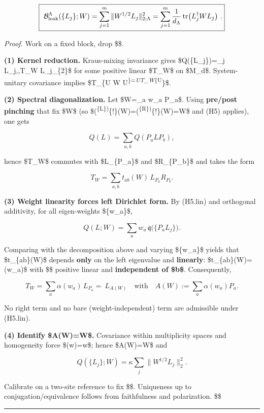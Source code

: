 \documentclass[
]{article}
\numberwithin{equation}{section}
\begin{document}
\[
\boxed{\ \mathcal B^{\Lambda}_{\rm leak}(\{L_j\};W)=\sum_{j=1}^m \|W^{1/2}L_j\|_{2;\Lambda}^2
=\sum_{j=1}^m\frac{1}{d_\Lambda}\operatorname{tr}\!\big(L_j^\dagger W L_j\big)\ .}
\]

\emph{Proof.} Work on a fixed block, drop \$\Lambda\$.

\textbf{(1) Kernel reduction.} Kraus-mixing invariance gives
\$Q(\{L\_j\})=\sum\_j \langle L\_j,,T\_W L\_j\rangle\_\{2\}\$ for some
positive linear \$T\_W\$ on \$M\_d\$. System-unitary covariance implies
\$T\_\{U W
U\textsuperscript{\dagger\}=\emph{U\circ T\_W\circ {}}\{U}\dagger\}\$.

\textbf{(2) Spectral diagonalization.} Let \$W=\sum\_a w\_a P\_a\$.
Using \textbf{pre/post pinching} that fix \$W\$ (so
\$(\Pi\textsuperscript{\{\rm L\})}\{!\}(W)=(\Pi\textsuperscript{\{\rm R\})}\{!\}(W)=W\$
and (H5) applies), one gets

\[
Q(L)=\sum_{a,b}Q(P_a L P_b),
\]

hence \$T\_W\$ commutes with \$L\_\{P\_a\}\$ and \$R\_\{P\_b\}\$ and
takes the form

\[
T_W=\sum_{a,b} t_{ab}(W)\,L_{P_a}R_{P_b}.
\]

\textbf{(3) Weight linearity forces left Dirichlet form.} By (H5.lin)
and orthogonal additivity, for all eigen-weights \$\{w\_a\}\$,

\[
Q(L;W)=\sum_a w_a\,\mathfrak q\!\big(\{P_a L_j\}\big).
\]

Comparing with the decomposition above and varying \$\{w\_a\}\$ yields
that \$t\_\{ab\}(W)\$ depends \textbf{only} on the left eigenvalue and
\textbf{linearly}: \$t\_\{ab\}(W)=\alpha(w\_a)\$ with \$\alpha\$
positive linear and \textbf{independent of \$b\$}. Consequently,

\[
T_W=\sum_a \alpha(w_a)\,L_{P_a}=\ L_{A(W)}\quad\text{with}\quad A(W):=\sum_a \alpha(w_a)P_a.
\]

No right term and no bare (weight-independent) term are admissible under
(H5.lin).

\textbf{(4) Identify \$A(W)=\kappa W\$.} Covariance within multiplicity
spaces and homogeneity force \$\alpha(w)=\kappa w\$; hence
\$A(W)=\kappa W\$ and

\[
Q(\{L_j\};W)=\kappa \sum_j \|W^{1/2}L_j\|_2^2.
\]

Calibrate on a two-site reference to fix \$\$. Uniqueness up to
conjugation/equivalence follows from faithfulness and polarization.
\$\square\$

\begin{center}\rule{0.5\linewidth}{0.5pt}\end{center}
\end{document}
